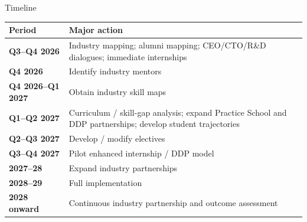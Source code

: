 \documentclass[aspectratio=169,11pt]{beamer}
\begin{document}
\begin{frame}{Timeline}
\scriptsize
\begin{tabularx}{\textwidth}{>{\bfseries}p{3.0cm} X}
\toprule
Period & Major action \\
\midrule
Q3--Q4 2026 & Industry mapping; alumni mapping; CEO/CTO/R\&D dialogues; immediate internships \\
Q4 2026 & Identify industry mentors \\
Q4 2026--Q1 2027 & Obtain industry skill maps \\
Q1--Q2 2027 & Curriculum / skill-gap analysis; expand Practice School and DDP partnerships; develop student trajectories \\
Q2--Q3 2027 & Develop / modify electives \\
Q3--Q4 2027 & Pilot enhanced internship / DDP model \\
2027--28 & Expand industry partnerships \\
2028--29 & Full implementation \\
2028 onward & Continuous industry partnership and outcome assessment \\
\bottomrule
\end{tabularx}
\end{frame}
\end{document}
